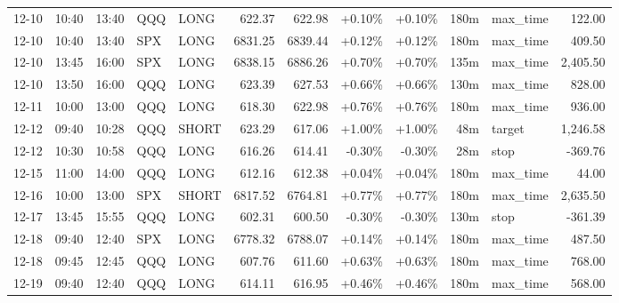 \documentclass[11pt,a4paper]{article}
\begin{document}
\begin{center}
\begin{longtable}{>{\color{txtmain}}l l l l l r r r r r >{\color{txtmain}}l r}
12-10 & 10:40 & 13:40 & QQQ & LONG & 622.37 & 622.98 & \textcolor{wingreen}{+0.10\%} & \textcolor{wingreen}{+0.10\%} & 180m & max\_time & \textcolor{wingreen}{122.00} \\
12-10 & 10:40 & 13:40 & SPX & LONG & 6831.25 & 6839.44 & \textcolor{wingreen}{+0.12\%} & \textcolor{wingreen}{+0.12\%} & 180m & max\_time & \textcolor{wingreen}{409.50} \\
12-10 & 13:45 & 16:00 & SPX & LONG & 6838.15 & 6886.26 & \textcolor{wingreen}{+0.70\%} & \textcolor{wingreen}{+0.70\%} & 135m & max\_time & \textcolor{wingreen}{2,405.50} \\
12-10 & 13:50 & 16:00 & QQQ & LONG & 623.39 & 627.53 & \textcolor{wingreen}{+0.66\%} & \textcolor{wingreen}{+0.66\%} & 130m & max\_time & \textcolor{wingreen}{828.00} \\
12-11 & 10:00 & 13:00 & QQQ & LONG & 618.30 & 622.98 & \textcolor{wingreen}{+0.76\%} & \textcolor{wingreen}{+0.76\%} & 180m & max\_time & \textcolor{wingreen}{936.00} \\
12-12 & 09:40 & 10:28 & QQQ & SHORT & 623.29 & 617.06 & \textcolor{wingreen}{+1.00\%} & \textcolor{wingreen}{+1.00\%} & 48m & target & \textcolor{wingreen}{1,246.58} \\
12-12 & 10:30 & 10:58 & QQQ & LONG & 616.26 & 614.41 & \textcolor{lossred}{-0.30\%} & \textcolor{lossred}{-0.30\%} & 28m & stop & \textcolor{lossred}{-369.76} \\
12-15 & 11:00 & 14:00 & QQQ & LONG & 612.16 & 612.38 & \textcolor{wingreen}{+0.04\%} & \textcolor{wingreen}{+0.04\%} & 180m & max\_time & \textcolor{wingreen}{44.00} \\
12-16 & 10:00 & 13:00 & SPX & SHORT & 6817.52 & 6764.81 & \textcolor{wingreen}{+0.77\%} & \textcolor{wingreen}{+0.77\%} & 180m & max\_time & \textcolor{wingreen}{2,635.50} \\
12-17 & 13:45 & 15:55 & QQQ & LONG & 602.31 & 600.50 & \textcolor{lossred}{-0.30\%} & \textcolor{lossred}{-0.30\%} & 130m & stop & \textcolor{lossred}{-361.39} \\
12-18 & 09:40 & 12:40 & SPX & LONG & 6778.32 & 6788.07 & \textcolor{wingreen}{+0.14\%} & \textcolor{wingreen}{+0.14\%} & 180m & max\_time & \textcolor{wingreen}{487.50} \\
12-18 & 09:45 & 12:45 & QQQ & LONG & 607.76 & 611.60 & \textcolor{wingreen}{+0.63\%} & \textcolor{wingreen}{+0.63\%} & 180m & max\_time & \textcolor{wingreen}{768.00} \\
12-19 & 09:40 & 12:40 & QQQ & LONG & 614.11 & 616.95 & \textcolor{wingreen}{+0.46\%} & \textcolor{wingreen}{+0.46\%} & 180m & max\_time & \textcolor{wingreen}{568.00} \\

\end{longtable}
\end{center}
\end{document}
